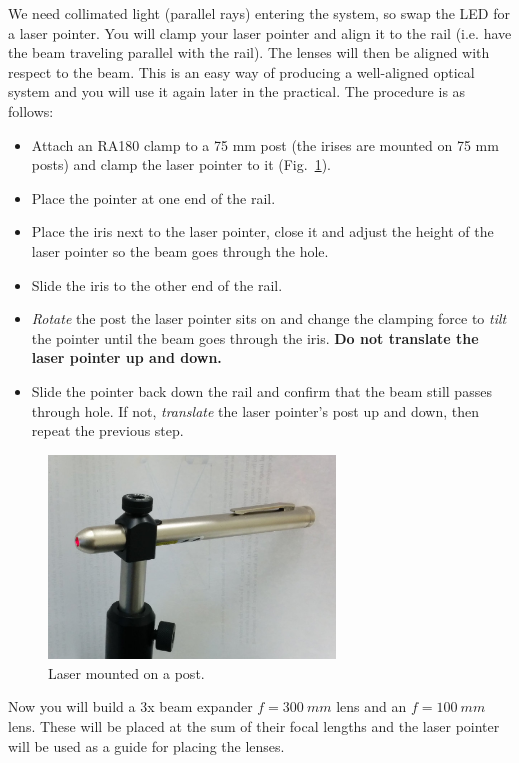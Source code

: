 \documentclass[a4paper]{report}
\begin{document}
We need collimated light (parallel rays) entering the system, so swap the LED for a laser pointer.
You will clamp your laser pointer and align it to the rail (i.e. have the beam traveling parallel with the rail). 
The lenses will then be aligned with respect to the beam. 
This is an easy way of producing a well-aligned optical system and you will use it again later in the practical.
The procedure is as follows:

\begin{itemize}
\item Attach an RA180 clamp to a 75 mm post (the irises are mounted on 75 mm posts) and clamp the laser pointer to it (Fig.~\ref{fig:mounted_laser}).
\item Place the pointer at one end of the rail.
\item Place the iris next to the laser pointer, close it and adjust the height of the laser pointer so the beam goes through the hole. 
\item Slide the iris to the other end of the rail. 
\item \textit{Rotate} the post the laser pointer sits on and change the clamping force to \textit{tilt} the pointer until the beam goes through the iris. 
\textbf{Do not translate the laser pointer up and down.}
\item Slide the pointer back down the rail and confirm that the beam still passes through hole. 
If not, \textit{translate} the laser pointer's post up and down, then repeat the previous step.
\end{itemize}

\begin{figure}[h]
\center
\includegraphics[width=3in]{mounted_laser.eps}
\caption{Laser mounted on a post.}
\label{fig:mounted_laser}
\end{figure}


Now you will build a 3x beam expander $f=300~mm$ lens and an $f=100~mm$ lens. 
These will be placed at the sum of their focal lengths and the laser pointer will be used as a guide for placing the lenses. 
\end{document}
